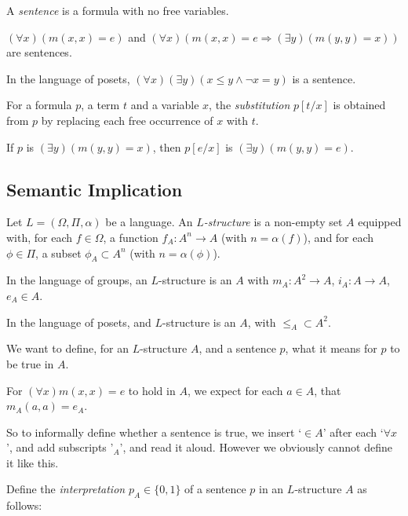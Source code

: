 \documentclass[12pt]{article}
\begin{document}
A \emph{sentence} is a formula with no free variables.

\begin{exbox}
	$(\forall x)(m(x,x) = e)$ and $(\forall x)(m(x,x) = e \Rightarrow (\exists y)(m(y,y) = x))$ are sentences.

	In the language of posets, $(\forall x)(\exists y)(x \leq y \wedge \neg x = y)$ is a sentence.
\end{exbox}

For a formula $p$, a term $t$ and a variable $x$, the \emph{substitution} $p[t/x]$ is obtained from $p$ by replacing each free occurrence of $x$ with $t$.

\begin{exbox}
	If $p$ is $(\exists y)(m(y,y) = x)$, then $p[e/x]$ is $(\exists y)(m(y,y) = e)$.
\end{exbox}

\subsection{Semantic Implication}
\label{sub:semantic_implication}

Let $L = (\Omega, \Pi, \alpha)$ be a language. An $L$\emph{-structure} is a non-empty set $A$ equipped with, for each  $f \in \Omega$, a function $f_A : A^{n} \to A$ (with $n = \alpha(f)$), and for each $\phi \in \Pi$, a subset $\phi_{A} \subset A^{n}$ (with $n = \alpha(\phi)$).

\begin{exbox}
	In the language of groups, an $L$-structure is an $A$ with $m_A : A^2 \to A$, $i_A : A \to A$, $e_A \in A$.

	In the language of posets, and $L$-structure is an $A$, with $\leq_{A} \subset A^2$.
\end{exbox}

We want to define, for an $L$-structure $A$, and a sentence $p$, what it means for $p$ to be true in $A$.

\begin{exbox}
	For $(\forall x)m(x,x) = e$ to hold in $A$, we expect for each $a \in A$, that $m_A(a,a) = e_A$.
\end{exbox}

So to informally define whether a sentence is true, we insert `$\in A$' after each `$\forall x$', and add subscripts '$_A$', and read it aloud. However we obviously cannot define it like this.

Define the \emph{interpretation} $p_A \in \{0, 1\}$ of a sentence $p$ in an $L$-structure $A$ as follows:
\end{document}

